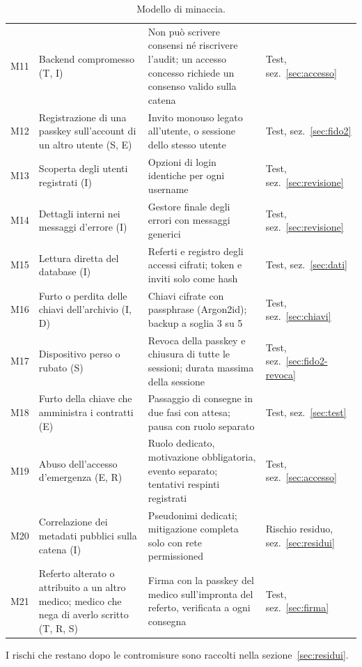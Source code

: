 \begin{table}[H]
\begin{tabular}{@{}l p{} p{} p{}@{}}
M11 & Backend compromesso (T, I) & Non può scrivere consensi né riscrivere l'audit; un accesso concesso richiede un consenso valido sulla catena & Test, sez.~\ref{sec:accesso}\\
M12 & Registrazione di una passkey sull'account di un altro utente (S, E) & Invito monouso legato all'utente, o sessione dello stesso utente & Test, sez.~\ref{sec:fido2}\\
M13 & Scoperta degli utenti registrati (I) & Opzioni di login identiche per ogni username & Test, sez.~\ref{sec:revisione}\\
M14 & Dettagli interni nei messaggi d'errore (I) & Gestore finale degli errori con messaggi generici & Test, sez.~\ref{sec:revisione}\\
M15 & Lettura diretta del database (I) & Referti e registro degli accessi cifrati; token e inviti solo come hash & Test, sez.~\ref{sec:dati}\\
M16 & Furto o perdita delle chiavi dell'archivio (I, D) & Chiavi cifrate con passphrase (Argon2id); backup a soglia 3 su 5 & Test, sez.~\ref{sec:chiavi}\\
M17 & Dispositivo perso o rubato (S) & Revoca della passkey e chiusura di tutte le sessioni; durata massima della sessione & Test, sez.~\ref{sec:fido2-revoca}\\
M18 & Furto della chiave che amministra i contratti (E) & Passaggio di consegne in due fasi con attesa; pausa con ruolo separato & Test, sez.~\ref{sec:test}\\
M19 & Abuso dell'accesso d'emergenza (E, R) & Ruolo dedicato, motivazione obbligatoria, evento separato; tentativi respinti registrati & Test, sez.~\ref{sec:accesso}\\
M20 & Correlazione dei metadati pubblici sulla catena (I) & Pseudonimi dedicati; mitigazione completa solo con rete permissioned & Rischio residuo, sez.~\ref{sec:residui}\\
M21 & Referto alterato o attribuito a un altro medico; medico che nega di averlo scritto (T, R, S) & Firma con la passkey del medico sull'impronta del referto, verificata a ogni consegna & Test, sez.~\ref{sec:firma}\\
\bottomrule
\end{tabular}
\caption{Modello di minaccia.}
\end{table}

I rischi che restano dopo le contromisure sono raccolti nella sezione~\ref{sec:residui}.
